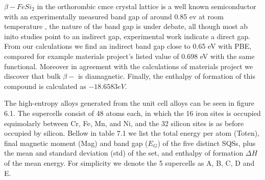 $\beta-FeSi_2$ in the orthorombic cmce crystal lattice is a well known semiconductor with an experimentally measured band gap of around 0.85 ev at room temperature \cite{PhysRevB.58.10389}, the nature of the band gap is under debate, all though most ab inito studies point to an indirect gap, experimental work indicate a direct gap. From our calculations we find an indirect band gap close to 0.65 eV with PBE, compared for example materials project's listed value of 0.698 eV with the same functional. Moreover in agreement with the calculations of materials project we discover that bulk $\beta-$  is diamagnetic. Finally, the enthalpy of formation of this compound is calculated as $-18.6583 eV$.

The high-entropy alloys generated from the  unit cell alloys can be seen in figure 6.1. The supercells consist of 48 atoms each, in which the 16 iron sites is occupied equimolarly between Cr, Fe, Mn, and Ni, and the 32 silicon sites is as before occupied by silicon. Bellow in table 7.1 we list the total energy per atom (Toten), final magnetic moment (Mag) and band gap ($E_G$) of the five distinct SQSs, plus the mean and standard deviation (std) of the set, and enthalpy of formation $\Delta H$ of the mean energy. For simplicity we denote the 5 supercells as A, B, C, D and E. 

